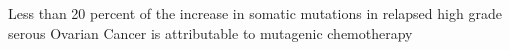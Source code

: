 Less than 20 percent of the increase in somatic mutations in relapsed high grade serous Ovarian Cancer is attributable to mutagenic chemotherapy
